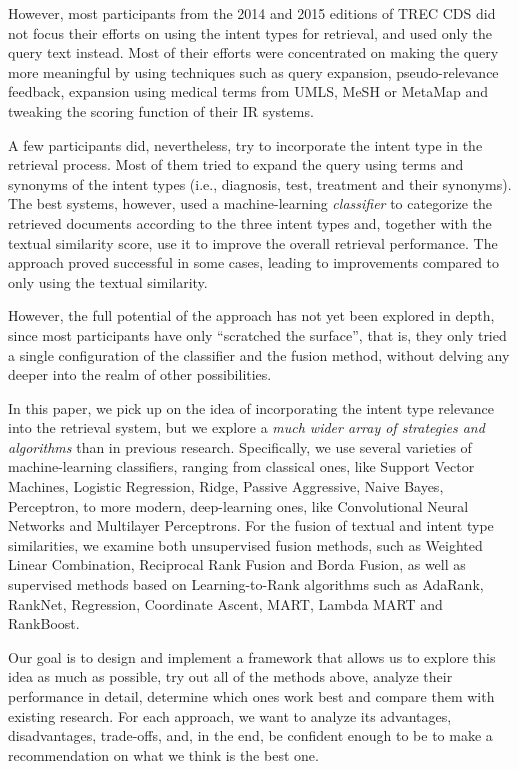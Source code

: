 However, most participants from the 2014 and 2015 editions of TREC CDS did not focus their efforts on using the intent types for retrieval,
and used only the query text instead. Most of their efforts were concentrated on making the query more meaningful by using techniques
such as query expansion, pseudo-relevance feedback, expansion using medical terms from UMLS, MeSH or MetaMap and tweaking
the scoring function of their IR systems.

A few participants did, nevertheless, try to incorporate the intent type in the retrieval process. Most of them
tried to expand the query using terms and synonyms of the intent types (i.e., diagnosis, test, treatment and their synonyms).
The best systems, however, used a machine-learning \emph{classifier} to categorize the retrieved documents according
to the three intent types and, together with the textual similarity score, use it to improve the overall retrieval performance.
The approach proved successful in some cases, leading to improvements compared to only using the textual similarity.

However, the full potential of the approach has not yet been explored in depth,
since most participants have only ``scratched the surface'', that is, they only tried a single configuration of
the classifier and the fusion method, without delving any deeper into the realm of other possibilities.

In this paper, we pick up on the idea of incorporating the intent type relevance into the retrieval system,
but we explore a \emph{much wider array of strategies and algorithms} than in previous research. Specifically,
we use several varieties of machine-learning classifiers, ranging from classical ones, like Support Vector Machines,
Logistic Regression, Ridge, Passive Aggressive, Naive Bayes, Perceptron,
to more modern, deep-learning ones, like Convolutional Neural Networks and Multilayer Perceptrons.
For the fusion of textual and intent type similarities,
we examine both unsupervised fusion methods, such as Weighted Linear Combination, Reciprocal Rank Fusion and Borda Fusion,
as well as supervised methods based
on Learning-to-Rank algorithms such as AdaRank, RankNet, Regression, Coordinate Ascent, MART, Lambda MART and RankBoost.

Our goal is to design and implement a framework that allows us
to explore this idea as much as possible, try out all of the methods above, 
analyze their performance in detail,
determine which ones work best and compare them with existing research.
For each approach, we want to analyze its advantages, disadvantages, trade-offs,
and, in the end, be confident enough to be to make a recommendation on what we think is the best one.

